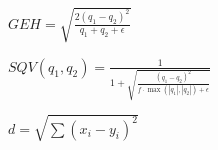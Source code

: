\documentclass{article}
\begin{document}
$ GEH = \sqrt{\frac{2 (q_1 - q_2)^2}{q_1 + q_2 + \epsilon}} $
\pagebreak

$ SQV(q_1, q_2) = \frac{1}{1 + \sqrt{\frac{(q_1 - q_2)^2}{f \cdot \max(|q_1|, |q_2|) + \epsilon}}} $
\pagebreak

$ d = \sqrt{\sum (x_i - y_i)^2} $
\pagebreak
\end{document}
